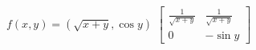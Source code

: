 {
$f(x,y) = (\sqrt{x+y}, \cos y)$
}
{
$\begin{bmatrix} 
\frac{1}{\sqrt{x+y}}& \frac{1}{\sqrt{x+y}} \\
0& -\sin y
\end{bmatrix}$
}